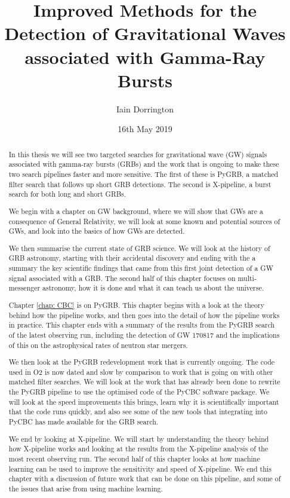 \documentclass[11pt]{cuthesis}
\title{Improved Methods for the Detection of Gravitational Waves associated with Gamma-Ray Bursts}
\author{Iain Dorrington}
\date{16th May 2019}
\newcommand{\xp}{X-pipeline }
\begin{document}

\maketitle

\frontmatter

\begin{abstract}
In this thesis we will see two targeted searches for gravitational wave (GW) signals associated with gamma-ray bursts (GRBs) and the work that is ongoing to make these two search pipelines faster and more sensitive. The first of these is PyGRB, a matched filter search that follows up short GRB detections. The second is X-pipeline, a burst search for both long and short GRBs. 

We begin with a chapter on GW background, where we will show that GWs are a consequence of General Relativity, we will look at some known and potential sources of GWs, and look into the basics of how GWs are detected. 

We then summarise the current state of GRB science. We will look at the history of GRB astronomy, starting with their accidental discovery and ending with the a summary the key scientific findings that came from this first joint detection of a GW signal associated with a GRB. The second half of this chapter focuses on multi-messenger astronomy, how it is done and what it can teach us about the universe.

Chapter \ref{chap: CBC} is on PyGRB. This chapter begins with a look at the theory behind how the pipeline works, and then goes into the detail of how the pipeline works in practice. This chapter ends with a summary of the results from the PyGRB search of the latest observing run, including the detection of GW 170817 and the implications of this on the astrophysical rates of neutron star mergers. 

We then look at the PyGRB redevelopment work that is currently ongoing. The code used in O2 is now dated and slow by comparison to work that is going on with other matched filter searches. We will look at the work that has already been done to rewrite the PyGRB pipeline to use the optimised code of the PyCBC software package. We will look at the speed improvements this brings, learn why it is scientifically important that the code runs quickly, and also see some of the new tools that integrating into PyCBC has made available for the GRB search. 

We end by looking at X-pipeline. We will start by understanding the theory behind how \xp works and looking at the results from the \xp analysis of the most recent observing run. The second half of this chapter looks at how machine learning can be used to improve the sensitivity and speed of X-pipeline. We end this chapter with a discussion of future work that can be done on this pipeline, and some of the issues that arise from using machine learning. 
\end{abstract}
\end{document}
